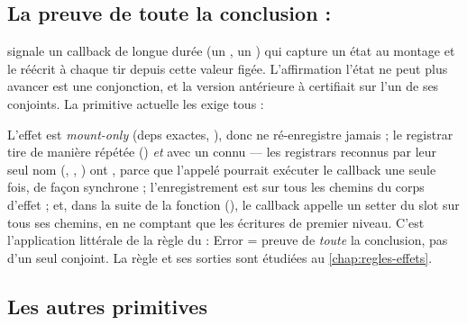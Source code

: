 \subsection{La preuve de toute la conclusion : }
\label{sec:api-regles-stale}

 signale un callback de longue durée (un , un ) qui capture un état au montage et le réécrit à chaque tir depuis cette valeur figée. L'affirmation \og l'état ne peut plus avancer\fg{} est une conjonction, et la version antérieure à  certifiait sur l'un de ses conjoints. La primitive actuelle les exige tous :


L'effet est \emph{mount-only} (deps \code{[]} exactes, ), donc ne ré-enregistre jamais ; le registrar tire de manière répétée () \emph{et} avec un  connu --- les registrars reconnus par leur seul nom (, , ) ont , parce que l'appelé pourrait exécuter le callback une seule fois, de façon synchrone ; l'enregistrement est sur tous les chemins du corps d'effet ; et, dans la suite de la fonction (), le callback appelle un setter du slot sur tous ses chemins, en ne comptant que les écritures de premier niveau. C'est l'application littérale de la règle du  : \og Error = preuve de \emph{toute} la conclusion, pas d'un seul conjoint\fg. La règle et ses sorties sont étudiées au \cref{chap:regles-effets}.

\subsection{Les autres primitives}

